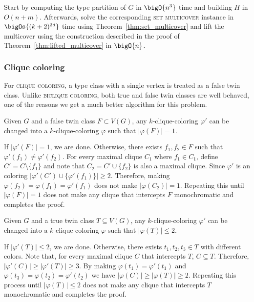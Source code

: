 \begin{tproof}
        Start by computing the type partition of $G$ in $\bigO{n^3}$ time and building $H$ in $O(n + m)$.
        Afterwards, solve the corresponding \textsc{set multicover} instance in $\bigOs{(k+2)^{2d}}$ time using Theorem~\ref{thm:set_multicover} and lift the multicover using the construction described in the proof of Theorem~\ref{thm:lifted_multicover} in $\bigO{n}$.
\end{tproof}

\subsubsection{Clique coloring}

For \textsc{clique coloring}, a type class with a single vertex is treated as a false twin class.
Unlike \textsc{biclique coloring}, both true and false twin classes are well behaved, one of the reasons we get a much better algorithm for this problem.


\begin{lemma}
    \label{lem:clique_false_twins}
    Given $G$ and a false twin class $F \subset V(G)$, any  $k$-clique-coloring $\varphi'$ can be changed into a $k$-clique-coloring $\varphi$ such that $|\varphi(F)| = 1$.
\end{lemma}

    \begin{tproof}
    If $|\varphi'(F)| = 1$, we are done.
    Otherwise, there exists $f_1, f_2 \in F$ such that $\varphi'(f_1) \neq \varphi'(f_2)$.
    For every maximal clique $C_1$ where $f_1 \in C_1$, define $C' = C \setminus \{f_1\}$ and note that $C_2 = C' \cup \{f_2\}$ is also a maximal clique.
    Since $\varphi'$ is an  coloring $|\varphi'(C') \cup \{\varphi'(f_1)\}| \geq 2$.
    Therefore, making $\varphi(f_2) = \varphi(f_1) = \varphi'(f_1)$ does not make $|\varphi(C_2)| = 1$. 
    Repeating this until $|\varphi(F)| = 1$ does not make any clique that intercepts $F$ monochromatic and completes the proof.
    \end{tproof}
    
\begin{lemma}
    \label{lem:clique_true_twins}
    Given $G$ and  a true twin class $T \subseteq V(G)$, any  $k$-clique-coloring $\varphi'$ can be changed into a $k$-clique-coloring $\varphi$ such that $|\varphi(T)| \leq 2$.
\end{lemma}

\begin{tproof}
    If $|\varphi'(T)| \leq 2$, we are done.
    Otherwise, there exists $t_1, t_2, t_3 \in T$ with different colors.
    Note that, for every maximal clique $C$ that intercepts $T$, $C \subseteq T$.
    Therefore, $|\varphi'(C)| \geq |\varphi'(T)| \geq 3$.
    By making $\varphi(t_1) = \varphi'(t_1)$ and $\varphi(t_3) = \varphi(t_2) = \varphi'(t_2)$ we have $|\varphi(C)| \geq |\varphi(T)| \geq 2$.
    Repeating this process until $|\varphi(T)| \leq 2$ does not make any clique that intercepts $T$ monochromatic and completes the proof.
\end{tproof}

